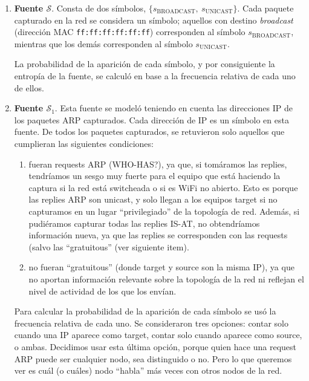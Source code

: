 \begin{enumerate}
    \item \textbf{Fuente $\mathcal{S}$}. Consta de dos símbolos, $\lbrace
    s_{\text{BROADCAST}},\ s_{\text{UNICAST}} \rbrace$. Cada paquete
    capturado en la red se considera un símbolo; aquellos con destino
    \emph{broadcast} (dirección MAC \texttt{ff:ff:ff:ff:ff:ff}) corresponden
    al símbolo $s_{\text{BROADCAST}}$, mientras que los demás corresponden
    al símbolo $s_{\text{UNICAST}}$.

    La probabilidad de la aparición de cada símbolo, y por consiguiente
    la entropía de la fuente, se calculó en base a la frecuencia relativa
    de cada uno de ellos.

    \item \textbf{Fuente $\mathcal{S}_1$}. Esta fuente se modeló teniendo en
    cuenta las direcciones IP de los paquetes ARP capturados. Cada dirección
    de IP es un símbolo en esta fuente. De todos los paquetes capturados, se
    retuvieron solo aquellos que cumplieran las siguientes condiciones:
    \begin{enumerate}
     \item fueran requests ARP (WHO-HAS?), ya que, si tomáramos las replies, tendríamos
     un sesgo muy fuerte para el equipo que está haciendo la captura si la red está switcheada
     o si es WiFi no abierto. Esto es porque las replies ARP son unicast, y solo llegan a los
     equipos target si no capturamos en un lugar ``privilegiado'' de la topología de red. Además,
     si pudiéramos capturar todas las replies IS-AT, no obtendríamos información nueva, ya que las
     replies se corresponden con las requests (salvo las ``gratuitous'' (ver siguiente item).
     \item no fueran ``gratuitous'' (donde target y source son la misma IP), ya que no
     aportan información relevante sobre la topología de la red ni reflejan el nivel de actividad de los que los envían.
    \end{enumerate}

    Para calcular la probabilidad de la aparición de cada símbolo se usó la frecuencia relativa de cada uno.
    Se consideraron tres opciones: contar solo cuando una IP aparece como target, contar solo cuando aparece como source, o ambas. Decidimos
    usar esta última opción, porque quien hace una request ARP puede ser cualquier nodo, sea distinguido o no. Pero lo que queremos
    ver es cuál (o cuáles) nodo ``habla'' más veces con otros nodos de la red.

\end{enumerate}

